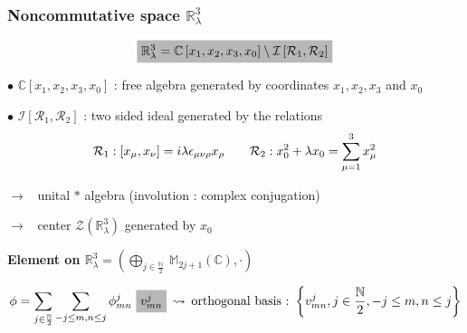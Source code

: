 \documentclass[9pt]{beamer}
\begin{document}
\begin{frame}

\frametitle{Noncommutative space $\mathbb{R}^3_\lambda$}

\vspace*{-10pt}

\begin{equation*}
\tikz[baseline]{\node[fill=black!28!white,anchor=base] (t1) {$\mathbb{R}^3_\lambda = \mathbb{C}\left[x_1,x_2,x_3,x_0\right] \setminus \mathcal{I}\left[\mathcal{R}_1,\mathcal{R}_2\right]$
}
;}
\end{equation*}

$\bullet$ $\mathbb{C}\left[x_1,x_2,x_3,x_0\right]$ : free algebra generated by coordinates $x_1, x_2, x_3$ and $x_0$

\vspace*{8pt}

$\bullet$ $\mathcal{I}\left[\mathcal{R}_1,\mathcal{R}_2\right]$ : two sided ideal generated by the relations
\vspace*{-5pt}
\begin{equation*}
\mathcal{R}_1 : \left[x_\mu,x_\nu\right] = i \lambda \epsilon_{\mu\nu\rho} x_\rho \qquad
\mathcal{R}_2 : x_0^2 + \lambda x_0 = \sum_{\mu=1}^{3} x_\mu^2
\vspace*{-5pt}
\end{equation*}

\quad $\to$ \ unital $\ast$ algebra (involution : complex conjugation)

\vspace*{4pt}

\quad $\to$ \ center $\mathcal{Z}\left(\mathbb{R}^3_\lambda\right)$ generated by $x_0$

\vspace*{8pt}

\textbf{Element on $\mathbb{R}^3_\lambda = \left(
\underset{j\in\frac{\mathbb{N}}{2}}{\bigoplus} \ \mathbb{M}_{2j+1}\left(\mathbb{C}\right), \cdot\right)$}

\vspace*{1pt}

\begin{equation*}
\phi = \sum_{j\in\frac{\mathbb{N}}{2}} \sum_{-j \leq m, n \leq j} \phi^j_{mn} \ 
\tikz[baseline]{\node[fill=black!28!white,anchor=base] (t1) {$v^j_{mn}$};} \hspace*{2pt} \leadsto \hspace*{2pt} \mbox{orthogonal basis :} \ \left\{ v^j_{mn} , j\in\frac{\mathbb{N}}{2} , -j \leq m,n \leq j \right\} 
\vspace*{-5pt}
\end{equation*}


\end{frame}
\end{document}
